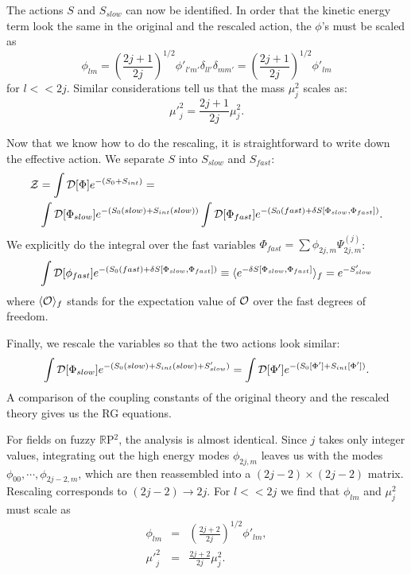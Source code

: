 \documentclass[a4paper,12pt]{article}
\numberwithin{equation}{section}
\begin{document}
The actions $S$ and $S_{slow}$ can now be identified. In order that
the kinetic energy term look the same in the original and the rescaled
action, the $\phi$'s must be scaled as
\begin{equation} 
\phi_{lm} = \left(\frac{2j+1}{2j}\right)^{1/2} \phi'_{l'm'} \delta_{l
l'} \delta_{m m'} = \left(\frac{2j+1}{2j}\right)^{1/2} \phi'_{lm}
\label{wfscaling}
\end{equation}
for $l << 2j$. 
Similar considerations tell us that the mass $\mu_j^2$ scales as:
\begin{equation}
{\mu'}_j^2 = \frac{2j+1}{2j}\mu_j^2.
\end{equation} 

Now that we know how to do the rescaling, it is straightforward to
write down the effective action. We separate $S$ into $S_{slow}$ and
$S_{fast}$:
\begin{eqnarray}  
\lefteqn{{\cal Z} = \int {\cal D}[\Phi]e^{-(S_0 + S_{int})} = } \nonumber \\
&& \int {\cal D}[\Phi_{slow}] e^{-(S_0 (slow) + S_{int} (slow))} \int {\cal
D}[\Phi_{fast}] e^{-(S_0 (fast) + \delta S [\Phi_{slow}, \Phi_{fast}])}.   
\end{eqnarray}  
We explicitly do the integral over the fast variables $\Phi_{fast} =
\sum \phi_{2j, m}\Psi^{(j)}_{2j,m}$:
\begin{equation}
\int {\cal D}[\phi_{fast}]e^{-(S_0(fast) + \delta S [\Phi_{slow},
\Phi_{fast}])} \equiv \langle e^{- \delta S[\Phi_{slow}, \Phi_{fast}]}
\rangle_f = e^{-S'_{slow}}
\label{fastint}
\end{equation}
where $\langle {\cal O}\rangle_f$ stands for the expectation value of
${\cal O}$ over the fast degrees of freedom.

Finally, we rescale the variables so that the two actions look
similar:
\begin{equation} 
\int {\cal D}[\Phi_{slow}] e^{-(S_0 (slow) + S_{int} (slow) + S'_{slow})}
= \int {\cal D}[\Phi']e^{-(S_0 [\Phi'] + S_{int}[\Phi'])}.
\end{equation} 
A comparison of the coupling constants of the original theory and the
rescaled theory gives us the RG equations. 

For fields on fuzzy ${\mathbb R}$P$^2$, the analysis is almost
identical. Since $j$ takes only integer values, integrating out the
high energy modes $\phi_{2j,m}$ leaves us with the modes $\phi_{00},
\cdots, \phi_{2j-2,m}$, which are then reassembled into a $(2j-2)
\times (2j-2)$ matrix. Rescaling corresponds to $(2j-2) \rightarrow
2j$. For $l<<2j$ we find that $\phi_{lm}$ and $\mu_j^2$ must scale as
\begin{eqnarray} 
\phi_{lm} &=& \left(\frac{2j+2}{2j}\right)^{1/2} \phi'_{lm},
\label{wfscalingRP} \\
{\mu'}_j^2 &=& \frac{2j+2}{2j}\mu_j^2.
\end{eqnarray} 
\end{document}
